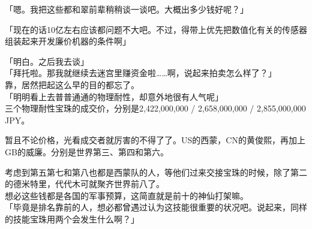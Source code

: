 「嗯。我把这些都和翠前辈稍稍谈一谈吧。大概出多少钱好呢？」

「现在的话10亿左右应该都问题不大吧。不过，得带上优先把数值化有关的传感器组装起来开发廉价机器的条件啊」

「明白。之后我去谈」\\

「拜托啦。那我就继续去迷宫里赚资金啦……啊，说起来拍卖怎么样了？」\\

靠，居然把起这么早的目的都忘了。\\

「明明看上去普普通通的物理耐性，却意外地很有人气呢」\\

三个物理耐性宝珠的成交价，分别是2,422,000,000 / 2,658,000,000 / 2,855,000,000 JPY。

暂且不论价格，光看成交者就厉害的不得了了。US的西蒙，CN的黄俊熙，再加上GB的威廉。分别是世界第三、第四和第六。

考虑到第五第七和第八也都是西蒙队的人，等他们过来交接宝珠的时候，除了第二的德米特里，代代木可就聚齐世界前八了。\\

想必这些钱都是各国的军事预算，这简直就是前十的神仙打架嘛。\\

「毕竟是排名靠前的人，想必都曾遇过认为这技能很重要的状况吧。说起来，同样的技能宝珠用两个会发生什么啊？」


